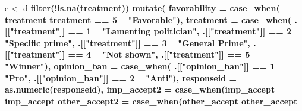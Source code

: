 \documentclass[
]{book}
\newenvironment{Shaded}{\begin{snugshade}}{\end{snugshade}}
\newcommand{\DataTypeTok}[1]{\textcolor[rgb]{0.13,0.29,0.53}{#1}}
\newcommand{\DecValTok}[1]{\textcolor[rgb]{0.00,0.00,0.81}{#1}}
\newcommand{\KeywordTok}[1]{\textcolor[rgb]{0.13,0.29,0.53}{\textbf{#1}}}
\newcommand{\NormalTok}[1]{#1}
\newcommand{\OperatorTok}[1]{\textcolor[rgb]{0.81,0.36,0.00}{\textbf{#1}}}
\newcommand{\StringTok}[1]{\textcolor[rgb]{0.31,0.60,0.02}{#1}}
\begin{document}
\begin{Shaded}
\begin{Highlighting}[]
{{{\NormalTok{e <-}\StringTok{ }\NormalTok{d }\OperatorTok{%>%}
\StringTok{  }\KeywordTok{filter}\NormalTok{(}\OperatorTok{!}\KeywordTok{is.na}\NormalTok{(treatment))}\OperatorTok{%>%}
\StringTok{  }\KeywordTok{mutate}\NormalTok{(}
    \DataTypeTok{favorability =} \KeywordTok{case_when}\NormalTok{(}
\NormalTok{    treatment }\OperatorTok{%in%}\StringTok{ }\DecValTok{1}\OperatorTok{:}\DecValTok{4} \OperatorTok{~}\StringTok{ "Unfavorable"}\NormalTok{,}
\NormalTok{    treatment }\OperatorTok{==}\StringTok{ }\DecValTok{5}    \OperatorTok{~}\StringTok{ "Favorable"}\NormalTok{),}
    \DataTypeTok{treatment =} \KeywordTok{case_when}\NormalTok{(}
\NormalTok{    .[[}\StringTok{"treatment"}\NormalTok{]] }\OperatorTok{==}\StringTok{ }\DecValTok{1} \OperatorTok{~}\StringTok{ "Lamenting politician"}\NormalTok{,}
\NormalTok{    .[[}\StringTok{"treatment"}\NormalTok{]] }\OperatorTok{==}\StringTok{ }\DecValTok{2} \OperatorTok{~}\StringTok{ "Specific prime"}\NormalTok{,}
\NormalTok{    .[[}\StringTok{"treatment"}\NormalTok{]] }\OperatorTok{==}\StringTok{ }\DecValTok{3} \OperatorTok{~}\StringTok{ "General Prime"}\NormalTok{,}
\NormalTok{    .[[}\StringTok{"treatment"}\NormalTok{]] }\OperatorTok{==}\StringTok{ }\DecValTok{4} \OperatorTok{~}\StringTok{ "Not shown"}\NormalTok{,}
\NormalTok{    .[[}\StringTok{"treatment"}\NormalTok{]] }\OperatorTok{==}\StringTok{ }\DecValTok{5} \OperatorTok{~}\StringTok{ "Winner"}\NormalTok{),}
    \DataTypeTok{opinion_ban =} \KeywordTok{case_when}\NormalTok{(}
\NormalTok{    .[[}\StringTok{"opinion_ban"}\NormalTok{]] }\OperatorTok{==}\StringTok{ }\DecValTok{1} \OperatorTok{~}\StringTok{ "Pro"}\NormalTok{,}
\NormalTok{    .[[}\StringTok{"opinion_ban"}\NormalTok{]] }\OperatorTok{==}\StringTok{ }\DecValTok{2} \OperatorTok{~}\StringTok{ "Anti"}\NormalTok{),}
    \DataTypeTok{responseid =} \KeywordTok{as.numeric}\NormalTok{(responseid),}
         \DataTypeTok{imp_accept2 =} \KeywordTok{case_when}\NormalTok{(imp_accept }\OperatorTok{%in%}\StringTok{ }\DecValTok{4}\OperatorTok{:}\DecValTok{5} \OperatorTok{~}\StringTok{ "Important"}\NormalTok{,}
\NormalTok{                                imp_accept }\OperatorTok{%in%}\StringTok{ }\DecValTok{1}\OperatorTok{:}\DecValTok{3} \OperatorTok{~}\StringTok{ "Not important"}\NormalTok{),}
         \DataTypeTok{other_accept2 =} \KeywordTok{case_when}\NormalTok{(other_accept }\OperatorTok{%in%}\StringTok{ }\DecValTok{4}\OperatorTok{:}\DecValTok{5} \OperatorTok{~}\StringTok{ "High degree"}\NormalTok{,}
\NormalTok{                                  other_accept }\OperatorTok{%in%}\StringTok{ }\DecValTok{1}\OperatorTok{:}\DecValTok{3} \OperatorTok{~}\StringTok{ "Low degree"}\NormalTok{),}
}}}}}}}}}}
\end{Highlighting}
\end{Shaded}
\end{document}

